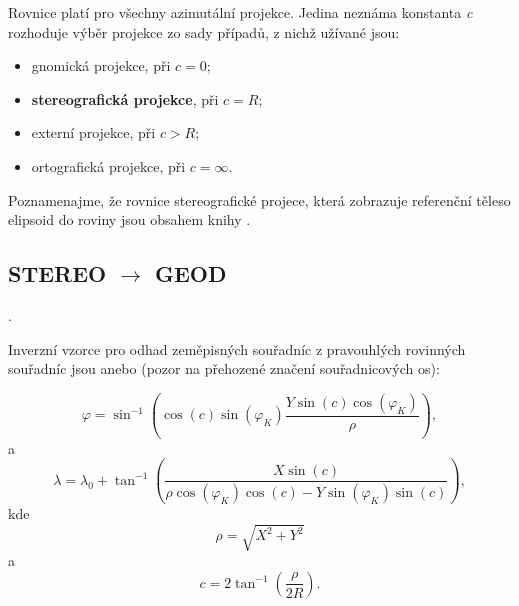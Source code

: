 \documentclass[11pt,a4paper]{article}
\begin{document}
Rovnice platí pro všechny azimutální projekce. Jedina neznáma konstanta \textit{c} rozhoduje výběr projekce zo sady případů, z nichž užívané jsou:
\begin{itemize}
\item gnomická projekce, při $c = 0$;
\item {\textbf{stereografická projekce}}, při $c = R$;
\item externí projekce, při $c > R$;
\item ortografická projekce, při $c = \infty$.
\end{itemize} 

Poznamenajme, že rovnice stereografické projece, která zobrazuje referenční těleso elipsoid do roviny jsou obsahem knihy \cite{Snyder1987}.

\subsection{STEREO $\rightarrow$ GEOD}.

Inverzní vzorce pro odhad zeměpisných souřadníc z pravouhlých rovinných souřadníc jsou \cite{Thomas1977} anebo \cite{stereoWolf} (pozor na přehozené značení souřadnicových os):

\begin{equation}
\varphi = \sin^{-1}{\left(\cos{\left(c\right)}\sin{\left(\varphi_{K}\right)}\dfrac{Y\sin{\left(c\right)}\cos{\left(\varphi_{K}\right)}}{\rho}\right)},
\end{equation}
a
\begin{equation}
\lambda = \lambda_{0} +  \tan^{-1}{\left(\dfrac{X\sin{\left(c\right)}}{\rho\cos{\left(\varphi_{K}\right)}\cos{\left(c\right)}-Y\sin{\left(\varphi_{K}\right)}\sin{\left(c\right)}}\right)},
\end{equation}
kde
\begin{equation}
\rho = \sqrt{X^{2} + Y^{2}}
\end{equation}
a
\begin{equation}
c = 2\tan^{-1}{\left(\dfrac{\rho}{2R}\right)}.
\end{equation}
\end{document}
